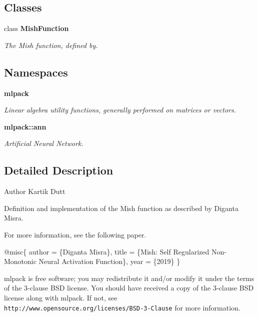 \subsection*{Classes}
\begin{DoxyCompactItemize}
\item 
class \textbf{ Mish\+Function}
\begin{DoxyCompactList}\small\item\em The Mish function, defined by. \end{DoxyCompactList}\end{DoxyCompactItemize}
\subsection*{Namespaces}
\begin{DoxyCompactItemize}
\item 
 \textbf{ mlpack}
\begin{DoxyCompactList}\small\item\em Linear algebra utility functions, generally performed on matrices or vectors. \end{DoxyCompactList}\item 
 \textbf{ mlpack\+::ann}
\begin{DoxyCompactList}\small\item\em Artificial Neural Network. \end{DoxyCompactList}\end{DoxyCompactItemize}


\subsection{Detailed Description}
\begin{DoxyAuthor}{Author}
Kartik Dutt
\end{DoxyAuthor}
Definition and implementation of the Mish function as described by Diganta Misra.

For more information, see the following paper.


\begin{DoxyCode}
@misc\{
  author = \{Diganta Misra\},
  title = \{Mish: Self Regularized Non-Monotonic Neural Activation Function\},
  year = \{2019\}
\}
\end{DoxyCode}


mlpack is free software; you may redistribute it and/or modify it under the terms of the 3-\/clause B\+SD license. You should have received a copy of the 3-\/clause B\+SD license along with mlpack. If not, see {\tt http\+://www.\+opensource.\+org/licenses/\+B\+S\+D-\/3-\/\+Clause} for more information. 